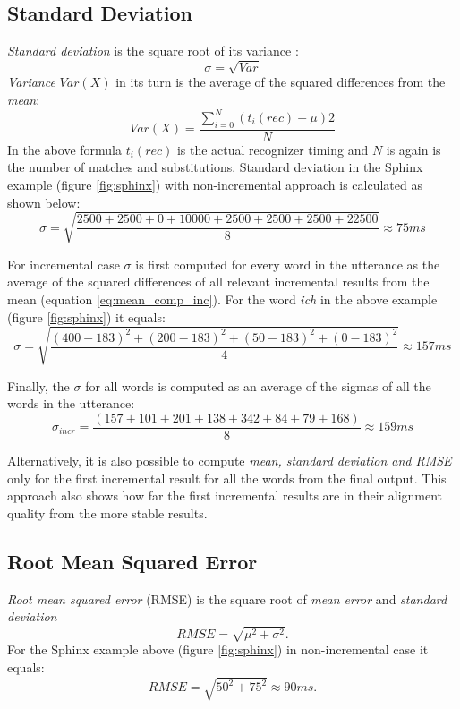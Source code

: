 \subsection {Standard Deviation}
\textit {Standard deviation} is the square root of its variance
:\begin{equation} \sigma=\sqrt {Var}
\end{equation}
\textit {Variance} $Var(X)$ in its turn is the average of the squared
differences from the \textit {mean}:
\begin{equation} Var(X)=\frac{\sum_{i=0}^N (t_i(rec)-\mu)2}{N}
\end{equation}
In the above formula $t_i(rec)$ is the actual recognizer timing and $N$ is again
is the number of matches and substitutions.  Standard deviation in the Sphinx
example (figure \ref{fig:sphinx}) with non-incremental approach is calculated as
shown below:
\begin{equation} \sigma=\sqrt {\frac
{2500+2500+0+10000+2500+2500+2500+22500}{8}}\approx 75 ms
\end{equation}

For incremental case $\sigma$ is first computed for every word in the utterance
as the average of the squared differences of all relevant incremental results from
the mean (equation \ref{eq:mean_comp_inc}). For the word \textit {ich} in the
above example (figure \ref{fig:sphinx}) it equals:
\begin{equation} \sigma=\sqrt {\frac
{(400-183)^2+(200-183)^2+(50-183)^2+(0-183)^2}{4}}\approx 157 ms
\end{equation}

Finally, the $\sigma$ for all words is computed as an average of the sigmas of
all the words in the utterance:
\begin{equation} \sigma_{incr}=\frac
{(157+101+ 201+138+342+ 84 +79 +168 )}{8}\approx 159
ms
\end{equation}

Alternatively, it is also possible to compute \textit {mean, standard deviation
and RMSE} only for the first incremental result for all the words from the final
output. This approach also shows how far the first incremental
results are in their alignment quality from the more stable results. 

\subsection {Root Mean Squared Error}
\textit {Root mean squared error} (RMSE) is the square root of  \textit {mean
error}  and \textit {standard deviation} \begin{equation} RMSE=\sqrt
{\mu^2+\sigma^2}. 
\end{equation}
For the Sphinx example above  (figure \ref{fig:sphinx}) in  non-incremental case
it equals:
\begin{equation} RMSE=\sqrt
{50^2+75^2} \approx 90 ms. 
\end{equation}


